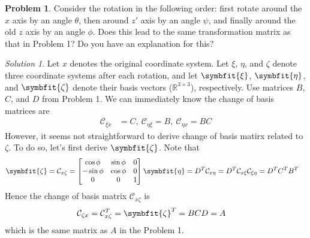 \documentclass[twoside,11pt]{article}
\newcommand{\lms}{\fontfamily{lmss}\selectfont} %
\theoremstyle{definition}
\newtheorem{problem}{\lms Problem}
\theoremstyle{remark}
\newtheorem*{solution}{Solution}
\begin{document}
\begin{problem}
Consider the rotation in the following order: first rotate around the $x$ axis
by an angle $\theta$, then around $z'$ axis by an angle $\psi$, and finally
around the old $z$ axis by an angle $\phi$.
Does this lead to the same transformation matrix as that in Problem 1?
Do you have an explanation for this?
\end{problem}
\begin{solution} 
Let $x$ denotes the original coordinate system. 
Let $\xi$, $\eta$, and $\zeta$ denote three coordinate systems after each rotation,
and let $\symbfit{\xi}$, $\symbfit{\eta}$, and $\symbfit{\zeta}$ denote their basis
vectors ($\mathbb{R}^{3\times 3}$), respectively.
Use matrices $B$, $C$, and $D$ from Problem 1.
We can immediately know the change of basis matrices are
\begin{align*}
    \mathcal{C}_{\xi x} &= C,~
    \mathcal{C}_{\eta\xi} = B,~
    \mathcal{C}_{\eta x} = BC
\end{align*}
However, it seems not straightforward to derive change of basis matirx related
to $\zeta$.
To do so, let's first derive $\symbfit{\zeta}$.
Note that
\begin{align*}
    \symbfit{\zeta} &= \mathcal{C}_{x\zeta}
    = \begin{bmatrix}
        \cos\phi  & \sin\phi & 0 \\
        -\sin\phi & \cos\phi & 0 \\
        0 & 0 & 1
    \end{bmatrix}\symbfit{\eta}
    = D^T
    \mathcal{C}_{x\eta}
    = D^T
    \mathcal{C}_{x\xi}
    \mathcal{C}_{\xi\eta}
    = D^T C^T B^T
\end{align*}
Hence the change of basis matrix $\mathcal{C}_{x\zeta}$ is
\begin{align*}
    \mathcal{C}_{\zeta x} &=
    \mathcal{C}_{x\zeta}^T
    = \symbfit{\zeta}^T
    = BCD = A
\end{align*}
which is the same matrix as $A$ in the Problem 1.
\end{solution}
\end{document}
